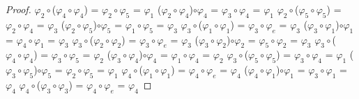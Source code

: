 \documentclass[10pt,a4paper,oneside]{article}
\begin{document}
\begin{proof}
				$\varphi_{2}\circ$($\varphi_{4}\circ\varphi_{4}$) = $\varphi_{2}\circ\varphi_{5}$ = $\varphi_{1}$
				\newline
				($\varphi_{2}\circ\varphi_{4}$)$\circ\varphi_{4}$ = $\varphi_{3}\circ\varphi_{4}$ = $\varphi_{1}$
				\newline
				\newline
				$\varphi_{2}\circ$($\varphi_{5}\circ\varphi_{5}$) = $\varphi_{2}\circ\varphi_{4}$ = $\varphi_{3}$
				\newline
				($\varphi_{2}\circ\varphi_{5}$)$\circ\varphi_{5}$ = $\varphi_{1}\circ\varphi_{5}$ = $\varphi_{3}$
				\newline
				\newline
				$\varphi_{3}\circ$($\varphi_{1}\circ\varphi_{1}$) = $\varphi_{3}\circ\varphi_{e}$ = $\varphi_{3}$
				\newline
				($\varphi_{3}\circ\varphi_{1}$)$\circ\varphi_{1}$ = $\varphi_{4}\circ\varphi_{1}$ = $\varphi_{3}$
				\newline
				\newline
				$\varphi_{3}\circ$($\varphi_{2}\circ\varphi_{2}$) = $\varphi_{3}\circ\varphi_{e}$ = $\varphi_{3}$
				\newline
				($\varphi_{3}\circ\varphi_{2}$)$\circ\varphi_{2}$ = $\varphi_{5}\circ\varphi_{2}$ = $\varphi_{3}$
				\newline
				\newline
				$\varphi_{3}\circ$($\varphi_{4}\circ\varphi_{4}$) = $\varphi_{3}\circ\varphi_{5}$ = $\varphi_{2}$
				\newline
				($\varphi_{3}\circ\varphi_{4}$)$\circ\varphi_{4}$ = $\varphi_{1}\circ\varphi_{4}$ = $\varphi_{2}$
				\newline
				\newline
				$\varphi_{3}\circ$($\varphi_{5}\circ\varphi_{5}$) = $\varphi_{3}\circ\varphi_{4}$ = $\varphi_{1}$
				\newline
				($\varphi_{3}\circ\varphi_{5}$)$\circ\varphi_{5}$ = $\varphi_{2}\circ\varphi_{5}$ = $\varphi_{1}$
				\newline
				\newline
				$\varphi_{4}\circ$($\varphi_{1}\circ\varphi_{1}$) = $\varphi_{4}\circ\varphi_{e}$ = $\varphi_{4}$
				\newline
				($\varphi_{4}\circ\varphi_{1}$)$\circ\varphi_{1}$ = $\varphi_{3}\circ\varphi_{1}$ = $\varphi_{4}$
				\newline
				\newline
				$\varphi_{4}\circ$($\varphi_{3}\circ\varphi_{3}$) = $\varphi_{4}\circ\varphi_{e}$ = $\varphi_{4}$

\end{proof}
\end{document}
